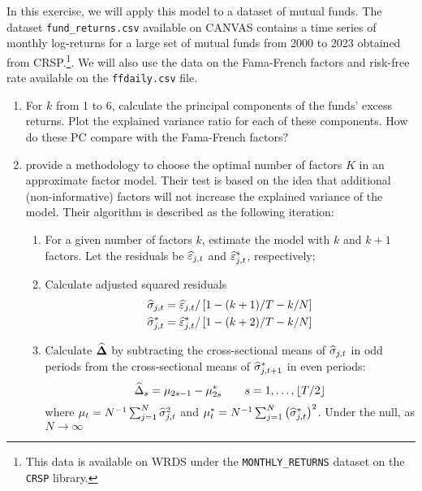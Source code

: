 In this exercise, we will apply this model to a dataset of mutual funds. The dataset \texttt{fund\_returns.csv} available on CANVAS contains a time series of monthly log-returns for a large set of mutual funds from 2000 to 2023 obtained from CRSP.\footnote{This data is available on WRDS under the \texttt{MONTHLY\_RETURNS} dataset on the \texttt{CRSP} library.}. We will also use the data on the Fama-French factors and risk-free rate available on the \texttt{ffdaily.csv} file.

\begin{enumerate}[label = \Alph*)]
    \item For \(k\) from 1 to 6, calculate the principal components of the funds' excess returns. Plot the explained variance ratio for each of these components. How do these PC compare with the Fama-French factors?
    \item \citet{connor1993test} provide a methodology to choose the optimal number of factors \(K\) in an approximate factor model. Their test is based on the idea that additional (non-informative) factors will not increase the explained variance of the model. Their algorithm is described as the following iteration:
    \begin{enumerate}[label = \arabic*), leftmargin = *]
        \item For a given number of factors \(k\), estimate the model with \(k\) and \(k+1\) factors. Let the residuals be \(\widehat{\varepsilon}_{j,t}\) and \(\widehat{\varepsilon}^\ast_{j,t}\), respectively;
        \item Calculate adjusted squared residuals
        \begin{equation}
            \begin{aligned}
                \widehat{\sigma}_{j,t} & = \widehat{\varepsilon}_{j,t}/\left[ 1-(k+1)/T-k/N \right] \\
                \widehat{\sigma}_{j,t}^\ast & = \widehat{\varepsilon}_{j,t}^\ast/\left[ 1-(k+2)/T-k/N \right]
            \end{aligned}
        \end{equation}
        \item Calculate \(\mathbf{\widehat{\Delta}}\) by subtracting the cross-sectional means of \(\widehat{\sigma}_{j,t}\) in odd periods from the cross-sectional means of \(\widehat{\sigma}_{j, t+1}^\ast\) in even periods:
        \begin{equation}
            \widehat{\Delta}_s = \mu_{2s-1} - \mu_{2s}^\ast \qquad s = 1, \dots, \left\lfloor T/2 \right\rfloor
        \end{equation}
        where \(\mu_t = N^{-1}\sum_{j=1}^N\widehat{\sigma}_{j,t}^2\) and \(\mu_t^\ast = N^{-1}\sum_{j=1}^N\left( \widehat{\sigma}_{j,t}^\ast \right)^2\). Under the null, as \(N \to \infty\)

\end{enumerate}
\end{enumerate}
